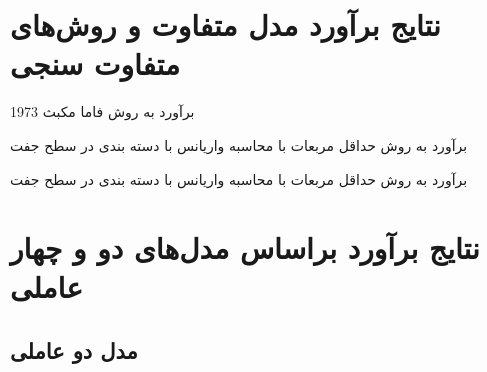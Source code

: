 \documentclass[12pt]{article}
\begin{document}
\newpage
\linespread{1.2}
\begin{appendices}


\section{نتایج برآورد مدل متفاوت و روش‌های متفاوت سنجی}




\label{sa.1}
 
 
 
 
 
   \begin{table}[htbp]
   \centering
   \begin{LTR}
   \lr{
      \resizebox{\textwidth}{!}{
      
      }
      }
   \end{LTR}
   \caption{برآورد به روش فاما مکبث 1973}
   \label{t15}
   \end{table}
 
 
 
 \begin{table}[htbp]
 \centering
 \begin{LTR}
 \lr{
    \resizebox{\textwidth}{!}{
    
    }
    }
 \end{LTR}
 \caption{برآورد به روش حداقل مربعات با محاسبه واریانس با دسته بندی در سطح جفت}
 \label{t8}
 \end{table}
 
  \begin{table}[htbp]
  \centering
  \begin{LTR}
  \lr{
     \resizebox{\textwidth}{!}{
     
     }
     }
  \end{LTR}
  \caption{برآورد به روش حداقل مربعات با محاسبه واریانس با دسته بندی در سطح جفت}
  \label{t13}
  \end{table}
 
 
  
 \FloatBarrier
 

\section{نتایج برآورد براساس مدل‌های دو و چهار عاملی}
\label{sa.3}
\subsection{مدل دو عاملی}
  

\end{appendices}
\end{document}
